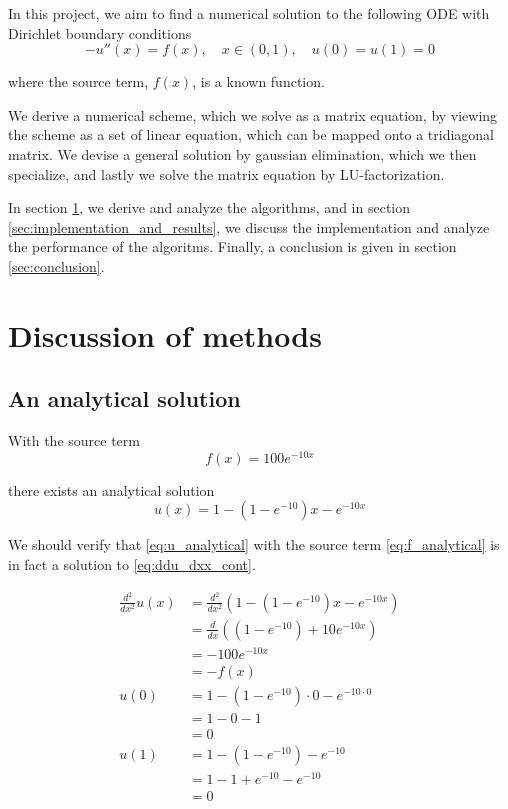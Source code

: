 \documentclass[a4paper]{article}
\begin{document}
In this project, we aim to find a numerical solution to the following ODE with Dirichlet boundary conditions
\begin{equation}
    -u''(x) = f(x), \quad x\in(0,1), \quad u(0) = u(1) = 0
    \label{eq:ddu_dxx_cont}
\end{equation}

where the source term, $f(x)$, is a known function.

We derive a numerical scheme, which we solve as a matrix equation, by viewing the scheme as a set of linear equation, which can be mapped onto a tridiagonal matrix. We devise a general solution by gaussian elimination, which we then specialize, and lastly we solve the matrix equation by LU-factorization.

In section \ref{sec:methods}, we derive and analyze the algorithms, and in section \ref{sec:implementation_and_results}, we discuss the implementation and analyze the performance of the algoritms. Finally, a conclusion is given in section \ref{sec:conclusion}.

\section{Discussion of methods}\label{sec:methods}
\subsection{An analytical solution}

With the source term
\begin{equation}
    f(x) = 100e^{-10x}
    \label{eq:f_analytical}
\end{equation}

there exists an analytical solution
\begin{equation}
    u(x) = 1-(1-e^{-10})x-e^{-10x}
    \label{eq:u_analytical}
\end{equation}

We should verify that \eqref{eq:u_analytical} with the source term \eqref{eq:f_analytical} is in fact a solution to \eqref{eq:ddu_dxx_cont}.

\begin{align*}
    \frac{d^2}{dx^2}  u(x)
    &= \frac{d^2}{dx^2} \left( 1-(1-e^{-10})x-e^{-10x} \right) \\
    &= \frac{d}{dx} \left( (1-e^{-10})+10e^{-10x} \right) \\
    &= -100e^{-10x} \\
    &= -f(x) \\
    u(0)
    &= 1-(1-e^{-10})\cdot 0-e^{-10 \cdot 0} \\
    &= 1-0-1 \\
    &= 0 \\
    u(1)
    &= 1 - (1-e^{-10}) - e^{-10} \\
    &= 1 - 1 + e^{-10} - e^{-10} \\
    &= 0
\end{align*}
\end{document}
